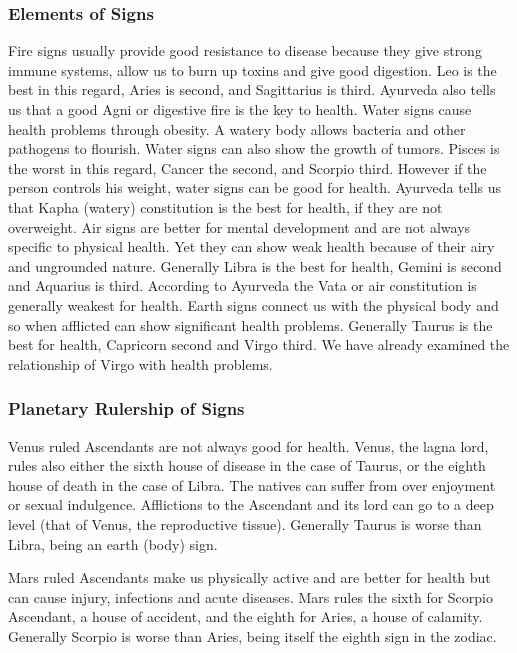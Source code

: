  

\subsubsection{Elements of Signs}

 

Fire signs usually provide good resistance to disease because they give strong immune systems, allow us to burn up toxins and give good digestion. Leo is the best in this regard, Aries is second, and Sagittarius is third. Ayurveda also tells us that a good Agni or digestive fire is the key to health.
Water signs cause health problems through obesity. A watery body allows bacteria and other pathogens to flourish. Water signs can also show the growth of tumors. Pisces is the worst in this regard, Cancer the second, and Scorpio third. However if the person controls his weight, water signs can be good for health. Ayurveda tells us that Kapha (watery) constitution is the best for health, if they are not overweight.
Air signs are better for mental development and are not always specific to physical health. Yet they can show weak health because of their airy and ungrounded nature. Generally Libra is the best for health, Gemini is second and Aquarius is third. According to Ayurveda the Vata or air constitution is generally weakest for health.
Earth signs connect us with the physical body and so when afflicted can show significant health problems. Generally Taurus is the best for health, Capricorn second and Virgo third. We have already examined the relationship of Virgo with health problems.
 

\subsubsection{Planetary Rulership of Signs}

 

Venus ruled Ascendants are not always good for health. Venus, the lagna lord, rules also either the sixth house of disease in the case of Taurus, or the eighth house of death in the case of Libra. The natives can suffer from over enjoyment or sexual indulgence. Afflictions to the Ascendant and its lord can go to a deep level (that of Venus, the reproductive tissue). Generally Taurus is worse than Libra, being an earth (body) sign.

 

Mars ruled Ascendants make us physically active and are better for health but can cause injury, infections and acute diseases. Mars rules the sixth for Scorpio Ascendant, a house of accident, and the eighth for Aries, a house of calamity. Generally Scorpio is worse than Aries, being itself the eighth sign in the zodiac.

